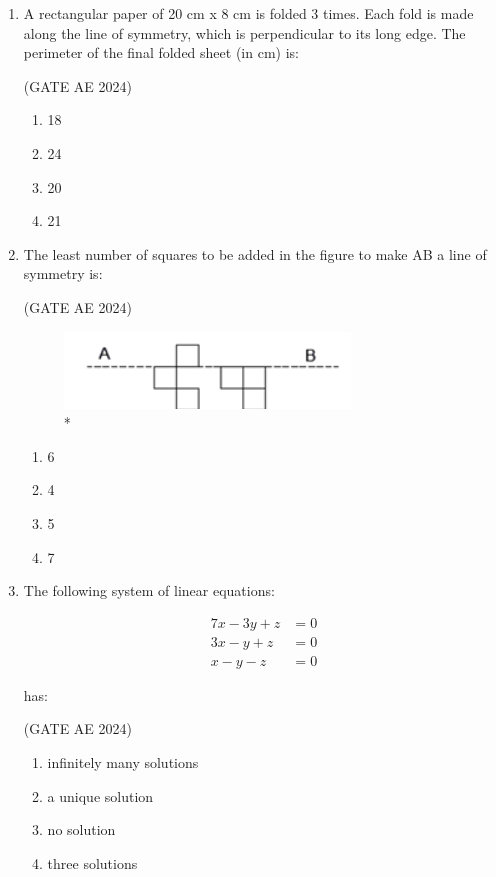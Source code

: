 \documentclass[journal,12pt,onecolumn]{IEEEtran}
\theoremstyle{remark}
\begin{document}
\begin{flushleft}
\begin{enumerate}
\item A rectangular paper of 20 cm x 8 cm is folded 3 times. Each fold is made along the line of symmetry, which is perpendicular to its long edge. The perimeter of the final folded sheet (in cm) is:

\hfill(GATE AE 2024)

\begin{enumerate}
    \item 18
    \item 24
    \item 20
    \item 21
 \end{enumerate}
 
 \item The least number of squares to be added in the figure to make AB a line of symmetry is:
 
 \hfill (GATE AE 2024)
 
\begin{figure}[H]
    
    \includegraphics[width=0.5\columnwidth]{figs/boxes.png}
    \caption{*}
    \label{fig:placeholder}
\end{figure}
\begin{enumerate}
    \item 6
    \item 4
    \item 5
    \item 7
\end{enumerate}

\item The following system of linear equations:

\begin{align*}
7x - 3y + z &= 0 \\
3x - y + z &= 0 \\
x - y - z &= 0
\end{align*}

has:

\hfill (GATE AE 2024)

\begin{enumerate}
    \item infinitely many solutions
    \item a unique solution
    \item no solution
    \item three solutions
\end{enumerate}


\end{enumerate}
\end{flushleft}
\end{document}
